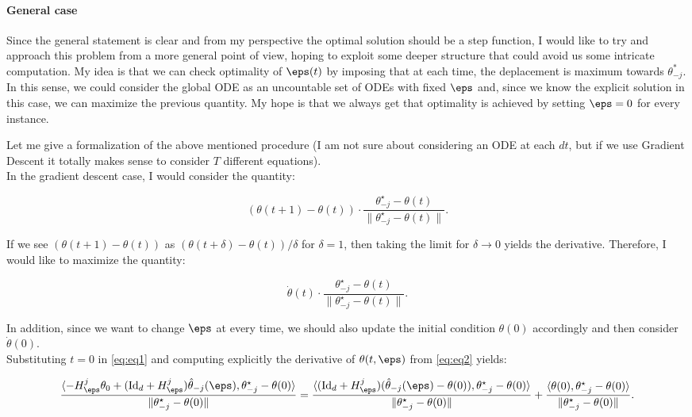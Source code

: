 \paragraph{General case} 
Since the general statement is clear and from my perspective the optimal solution should be a step function, I would like to try and approach this problem from a more general point of view, hoping to exploit some deeper structure that could avoid us some intricate computation.
My idea is that we can check optimality of $\eps(t)$ by imposing that at each time, the deplacement is maximum towards $\theta^*_{-j}$. 
In this sense, we could consider the global ODE as an uncountable set of ODEs with fixed $\eps$ and, since we know the explicit solution in this case, we can maximize the previous quantity.
My hope is that we always get that optimality is achieved by setting $\eps=0$ for every instance.

Let me give a formalization of the above mentioned procedure (I am not sure about considering an ODE at each $dt$, but if we use Gradient Descent it totally makes sense to consider $T$ different equations).\\
In the gradient descent case, I would consider the quantity:

\begin{equation*}
  (\theta(t+1)-\theta(t))\cdot\frac{\theta^\star_{-j}-\theta(t)}{\|\theta^\star_{-j}-\theta(t)\|} .
\end{equation*}

If we see $(\theta(t+1)-\theta(t))$ as $(\theta(t+\delta)-\theta(t))/\delta$ for $\delta=1$, then taking the limit for $\delta\to0$ yields the derivative.
Therefore, I would like to maximize the quantity:

\begin{equation}\label{eq:eq1}
  \dot\theta(t)\cdot\frac{\theta^\star_{-j}-\theta(t)}{\|\theta^\star_{-j}-\theta(t)\|} .
\end{equation}

In addition, since we want to change $\eps$ at every time, we should also update the initial condition $\theta(0)$ accordingly and then consider $\dot\theta(0)$.\\
Substituting $t=0$ in \ref{eq:eq1} and computing explicitly the derivative of $\theta(t,\eps)$ from \ref{eq:eq2} yields:

\begin{equation*}
  \frac{\langle -H^j_\eps \theta_0 +(\mathrm{Id}_d + H^j_\eps)\hat\theta_{-j}(\eps) , \theta^\star_{-j}-\theta(0)\rangle}{\|\theta^\star_{-j}-\theta(0)\|} = 
  \frac{\langle (\mathrm{Id}_d + H^j_\eps) (\hat\theta_{-j}(\eps)-\theta(0)), \theta^\star_{-j}-\theta(0)\rangle}{\|\theta^\star_{-j}-\theta(0)\|} + \frac{\langle \theta(0), \theta^\star_{-j}-\theta(0)\rangle}{\|\theta^\star_{-j}-\theta(0)\|}.
\end{equation*}

